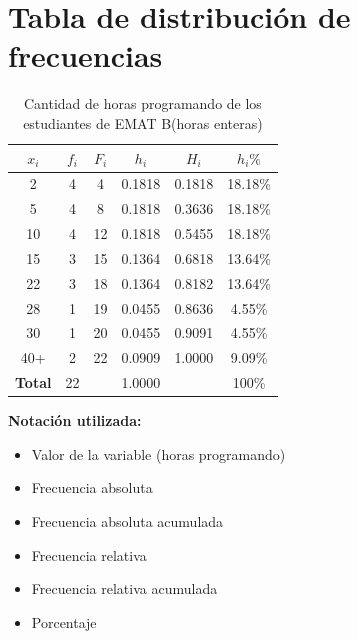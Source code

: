 \documentclass[12pt,letterpaper]{article}
\begin{document}
\vspace{1cm}

\section*{Tabla de distribución de frecuencias}

\begin{table}[H]
    \centering
    \caption{Cantidad de horas programando de los estudiantes de EMAT B(horas enteras)}
    \label{tab:horas-programando}
    \begin{tabular}{@{}cccccc@{}}
        \toprule
        $x_i$ & $f_i$ & $F_i$ & $h_i$ & $H_i$ & $h_i\%$ \\
        \midrule
        2 & 4 & 4 & 0.1818 & 0.1818 & 18.18\% \\
        5 & 4 & 8 & 0.1818 & 0.3636 & 18.18\% \\
        10 & 4 & 12 & 0.1818 & 0.5455 & 18.18\% \\
        15 & 3 & 15 & 0.1364 & 0.6818 & 13.64\% \\
        22 & 3 & 18 & 0.1364 & 0.8182 & 13.64\% \\
        28 & 1 & 19 & 0.0455 & 0.8636 & 4.55\% \\
        30 & 1 & 20 & 0.0455 & 0.9091 & 4.55\% \\
        40+ & 2 & 22 & 0.0909 & 1.0000 & 9.09\% \\
        \midrule
        \textbf{Total} & 22 & & 1.0000 & & 100\% \\
        \bottomrule
    \end{tabular}
\end{table}

\noindent\textbf{Notación utilizada:}
\begin{itemize}[leftmargin=2cm]
    \item[$x_i$] Valor de la variable (horas programando)
    \item[$f_i$] Frecuencia absoluta
    \item[$F_i$] Frecuencia absoluta acumulada
    \item[$h_i$] Frecuencia relativa
    \item[$H_i$] Frecuencia relativa acumulada
    \item[$h_i\%$] Porcentaje
\end{itemize}
\end{document}
